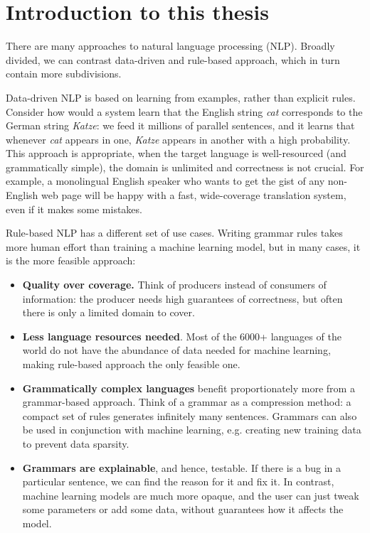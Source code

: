 \chapter{Introduction to this thesis}

There are many approaches to natural language processing (NLP).
Broadly divided, we can contrast data-driven and rule-based approach,
which in turn contain more subdivisions.

Data-driven NLP is based on learning from examples, rather than
explicit rules. Consider how would a system learn that the English
string \emph{cat} corresponds to the German string \emph{Katze}: we
feed it millions of parallel sentences, and it learns that whenever
\emph{cat} appears in one, \emph{Katze} appears in another with a high
probability. This approach is appropriate, when the target language is
well-resourced (and grammatically simple), the domain is unlimited and
correctness is not crucial. For example, a monolingual English speaker
who wants to get the gist of any non-English web page will be happy
with a fast, wide-coverage translation system, even if it makes some
mistakes.

Rule-based NLP has a different set of use cases. Writing grammar rules
takes more human effort than training a machine learning model, but in
many cases, it is the more feasible approach:
\begin{itemize}
  \setlength\itemsep{0.0em} \item \textbf{Quality over coverage.}
  Think of producers instead of consumers of information: the producer
  needs high guarantees of correctness, but often there is only a
  limited domain to cover. %

\item \textbf{Less language resources needed}. Most of the 6000+
  languages of the world do not have the abundance of data needed for
  machine learning, making rule-based approach the only feasible one.

\item \textbf{Grammatically complex languages} benefit proportionately
  more from a grammar-based approach. Think of a grammar as a
  compression method: a compact set of rules generates infinitely many
  sentences. Grammars can also be used in conjunction with machine
  learning, e.g. creating new training data to prevent data sparsity.

\item \textbf{Grammars are explainable}, and hence, testable. If there
  is a bug in a particular sentence, we can find the reason for it and
  fix it. In contrast, machine learning models are much more opaque,
  and the user can just tweak some parameters or add some data, without guarantees how
  it affects the model.
\end{itemize}

